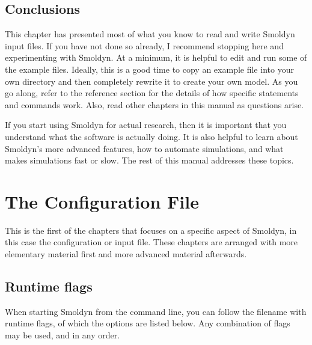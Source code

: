 \documentclass {book}
\begin{document}
\section{Conclusions}

This chapter has presented most of what you know to read and write Smoldyn input files. If you have not done so already, I recommend stopping here and experimenting with Smoldyn. At a minimum, it is helpful to edit and run some of the example files. Ideally, this is a good time to copy an example file into your own directory and then completely rewrite it to create your own model. As you go along, refer to the reference section for the details of how specific statements and commands work. Also, read other chapters in this manual as questions arise.

If you start using Smoldyn for actual research, then it is important that you understand what the software is actually doing. It is also helpful to learn about Smoldyn's more advanced features, how to automate simulations, and what makes simulations fast or slow. The rest of this manual addresses these topics.


\chapter{The Configuration File}

This is the first of the chapters that focuses on a specific aspect of Smoldyn, in this case the configuration or input file. These chapters are arranged with more elementary material first and more advanced material afterwards.

\section{Runtime flags}

When starting Smoldyn from the command line, you can follow the filename with runtime flags, of which the options are listed below. Any combination of flags may be used, and in any order.
\end{document}
